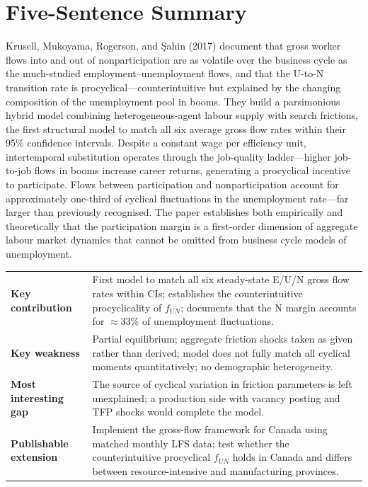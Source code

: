 \section*{Five-Sentence Summary}

Krusell, Mukoyama, Rogerson, and \c{S}ahin (2017) document that gross worker
flows into and out of nonparticipation are as volatile over the business cycle
as the much-studied employment--unemployment flows, and that the U-to-N
transition rate is procyclical---counterintuitive but explained by the changing
composition of the unemployment pool in booms. They build a parsimonious hybrid
model combining heterogeneous-agent labour supply with search frictions, the
first structural model to match all six average gross flow rates within their
95\% confidence intervals. Despite a constant wage per efficiency unit,
intertemporal substitution operates through the job-quality ladder---higher
job-to-job flows in booms increase career returns, generating a procyclical
incentive to participate. Flows between participation and nonparticipation
account for approximately one-third of cyclical fluctuations in the
unemployment rate---far larger than previously recognised. The paper
establishes both empirically and theoretically that the participation margin
is a first-order dimension of aggregate labour market dynamics that cannot be
omitted from business cycle models of unemployment.

\vspace{6pt}
\begin{quickref}
\begin{tabularx}{\linewidth}{@{}lX@{}}
\textbf{Key contribution} &
  First model to match all six steady-state E/U/N gross flow rates within
  CIs; establishes the counterintuitive procyclicality of $f_{UN}$; documents
  that the N margin accounts for $\approx$33\% of unemployment fluctuations.
  \\[4pt]
\textbf{Key weakness} &
  Partial equilibrium; aggregate friction shocks taken as given rather than
  derived; model does not fully match all cyclical moments quantitatively;
  no demographic heterogeneity. \\[4pt]
\textbf{Most interesting gap} &
  The source of cyclical variation in friction parameters is left unexplained;
  a production side with vacancy posting and TFP shocks would complete the
  model. \\[4pt]
\textbf{Publishable extension} &
  Implement the gross-flow framework for Canada using matched monthly LFS data;
  test whether the counterintuitive procyclical $f_{UN}$ holds in Canada and
  differs between resource-intensive and manufacturing provinces.
\end{tabularx}
\end{quickref}
